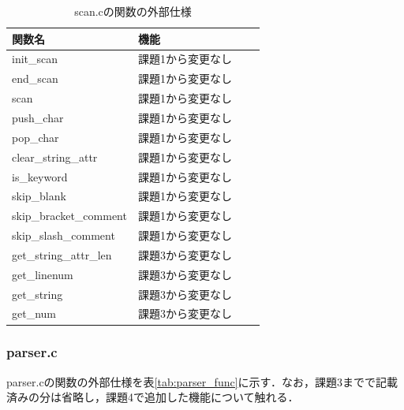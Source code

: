 \documentclass{jlreq}
\begin{document}
\begin{table}[H]
  \centering
  \caption{scan.cの関数の外部仕様}
  \begin{tabular}{|l|p{6cm}|l|p{3cm}|}
    \hline
    関数名                 & 機能              \\ \hline
    init\_scan             & 課題1から変更なし \\
    end\_scan              & 課題1から変更なし \\
    scan                   & 課題1から変更なし \\
    push\_char             & 課題1から変更なし \\
    pop\_char              & 課題1から変更なし \\
    clear\_string\_attr    & 課題1から変更なし \\
    is\_keyword            & 課題1から変更なし \\
    skip\_blank            & 課題1から変更なし \\
    skip\_bracket\_comment & 課題1から変更なし \\
    skip\_slash\_comment   & 課題1から変更なし \\
    get\_string\_attr\_len & 課題3から変更なし \\
    get\_linenum           & 課題3から変更なし \\
    get\_string            & 課題3から変更なし \\
    get\_num               & 課題3から変更なし \\ \hline
  \end{tabular}
  \label{tab:scan_func}
\end{table}

\subsubsection{parser.c}
parser.cの関数の外部仕様を表\ref{tab:parser_func}に示す．なお，課題3までで記載済みの分は省略し，課題4で追加した機能について触れる．
\end{document}
